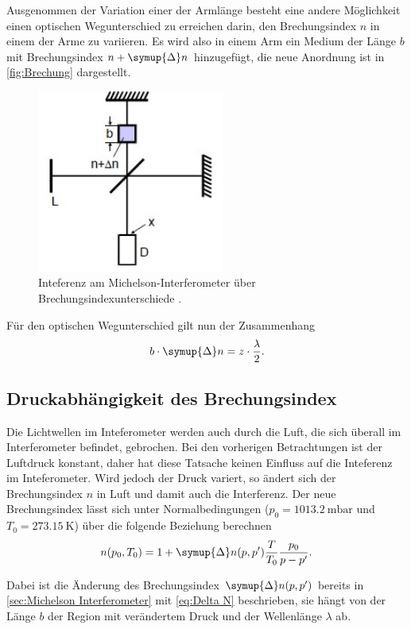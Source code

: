 Ausgenommen der Variation einer der Armlänge besteht eine andere Möglichkeit einen optischen Wegunterschied zu erreichen darin,
den Brechungsindex $n$ in einem der Arme zu variieren.
Es wird also in einem Arm ein Medium der Länge $b$ mit Brechungsindex $n+\symup{\Delta}n$ hinzugefügt, die
neue Anordnung ist in \autoref{fig:Brechung} dargestellt.
\begin{figure}[H]
    \centering
    \includegraphics[height=6cm]{content/pics/Brechung.jpg}
    \caption{Inteferenz am Michelson-Interferometer über Brechungsindexunterschiede \cite{v401}.}
    \label{fig:Brechung}
\end{figure}
Für den optischen Wegunterschied gilt nun der Zusammenhang
\begin{equation}
    \label{eq:Delta N}
    b \cdot \symup{\Delta}n=z \cdot \frac{\lambda}{2}.
\end{equation}

\subsection{Druckabhängigkeit des Brechungsindex}

Die Lichtwellen im Inteferometer werden auch durch die Luft, die sich überall im Interferometer befindet,
gebrochen. Bei den vorherigen Betrachtungen ist der Luftdruck konstant, daher hat diese Tatsache
keinen Einfluss auf die Inteferenz im Inteferometer.
Wird jedoch der Druck variert, so ändert sich der Brechungsindex $n$ in Luft und damit auch die Interferenz.
Der neue Brechungsindex lässt sich unter Normalbedingungen ($p_0=\qty{1013.2}{\milli\bar}$ und $T_0=\qty{273.15}{\kelvin}$)
über die folgende Beziehung berechnen
\begin{equation}
    \label{eq:Brechung}
    n(p_0, T_0) = 1 + \symup{\Delta} n(p,p')\frac{T}{T_0}\frac{p_0}{p - p'}.
\end{equation}

Dabei ist die Änderung des Brechungsindex $\symup{\Delta} n(p,p')$ bereits in \autoref{sec:Michelson Interferometer} mit
\eqref{eq:Delta N} beschrieben, sie hängt von der Länge $b$ der Region mit verändertem Druck und der
Wellenlänge $\lambda$ ab.